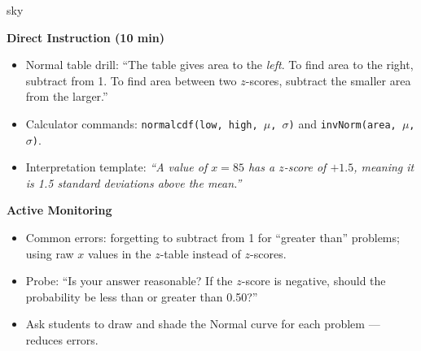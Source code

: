 \documentclass[10pt]{article}
\begin{document}
\boxguard
\begin{skillbox}{sky}
\begin{minipage}[t]{0.48\linewidth}
    \textbf{Direct Instruction (10 min)}
    \begin{itemize}
        \item Normal table drill: ``The table gives area to the \textit{left}. To find area to the right, subtract from 1. To find area between two $z$-scores, subtract the smaller area from the larger.''
        \item Calculator commands: \texttt{normalcdf(low, high, $\mu$, $\sigma$)} and \texttt{invNorm(area, $\mu$, $\sigma$)}.
        \item Interpretation template: \textit{``A value of $x = 85$ has a $z$-score of $+1.5$, meaning it is 1.5 standard deviations above the mean.''}
    \end{itemize}
\end{minipage}
\hfill
\begin{minipage}[t]{0.48\linewidth}
    \textbf{Active Monitoring}
    \begin{itemize}
        \item Common errors: forgetting to subtract from 1 for ``greater than'' problems; using raw $x$ values in the $z$-table instead of $z$-scores.
        \item Probe: ``Is your answer reasonable? If the $z$-score is negative, should the probability be less than or greater than 0.50?''
        \item Ask students to draw and shade the Normal curve for each problem --- reduces errors.
    \end{itemize}
\end{minipage}
\end{skillbox}
\end{document}
